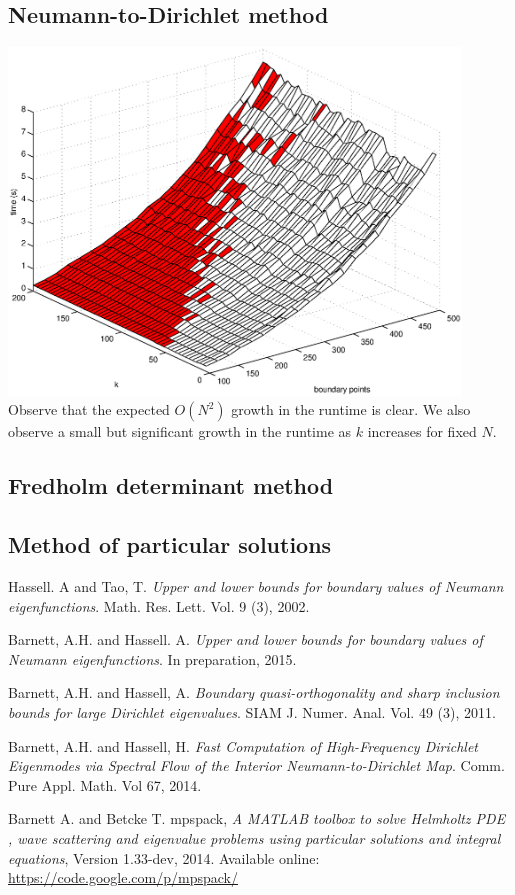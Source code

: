 \documentclass{article}
\begin{document}
\subsection{Neumann-to-Dirichlet method}
\includegraphics[width=0.9\textwidth]{dtn.eps} \\
Observe that the expected $O(N^2)$ growth in the runtime is clear.
We also observe a small but significant growth in the runtime as $k$ increases for fixed $N$.
\subsection{Fredholm determinant method}
\subsection{Method of particular solutions}

\begin{thebibliography}{9}

Hassell. A and Tao, T.
\textsl{Upper and lower bounds for boundary values of Neumann eigenfunctions}.
Math. Res. Lett. Vol. 9 (3), 2002. %

Barnett, A.H. and Hassell. A.
\textsl{Upper and lower bounds for boundary values of Neumann eigenfunctions}.
In preparation, 2015.

Barnett, A.H. and Hassell, A.
\textsl{Boundary quasi-orthogonality and sharp inclusion bounds for large Dirichlet eigenvalues}.
SIAM J. Numer. Anal. Vol. 49 (3), 2011.

Barnett, A.H. and Hassell, H.
\textsl{Fast Computation of High-Frequency Dirichlet Eigenmodes via Spectral Flow of the Interior Neumann-to-Dirichlet Map}.
Comm. Pure Appl. Math. Vol 67, 2014.

Barnett A. and Betcke T.
mpspack,
\textsl{A MATLAB toolbox to solve Helmholtz PDE , wave scattering and eigenvalue problems using particular solutions and integral equations},
Version 1.33-dev, 2014.
Available online: \url{https://code.google.com/p/mpspack/}

\end{thebibliography}
\end{document}
